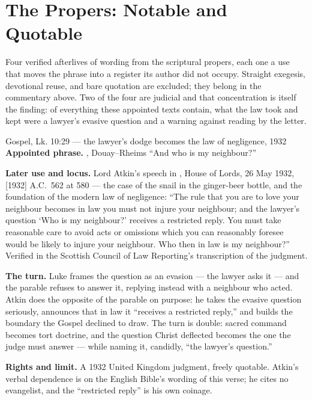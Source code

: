 \sectionguard
\section*{The Propers: Notable and Quotable}

Four verified afterlives of wording from the scriptural propers, each one a
use that moves the phrase into a register its author did not occupy. Straight
exegesis, devotional reuse, and bare quotation are excluded; they belong in
the commentary above. Two of the four are judicial and that concentration is
itself the finding: of everything these appointed texts contain, what the
law took and kept were a lawyer's evasive question and a warning against
reading by the letter.

\begin{afterlife}{Gospel, Lk. 10:29 --- the lawyer's dodge becomes the law of negligence, 1932}
\textbf{Appointed phrase.} , Douay--Rheims
``And who is my neighbour?''

\textbf{Later use and locus.} Lord Atkin's speech in , House of Lords, 26 May 1932, [1932] A.C.\ 562 at 580 --- the case
of the snail in the ginger-beer bottle, and the foundation of the modern law
of negligence: ``The rule that you are to love your neighbour becomes in law
you must not injure your neighbour; and the lawyer's question `Who is my
neighbour?' receives a restricted reply. You must take reasonable care to
avoid acts or omissions which you can reasonably foresee would be likely to
injure your neighbour. Who then in law is my neighbour?'' Verified in the
Scottish Council of Law Reporting's transcription of the judgment.

\textbf{The turn.} Luke frames the question as an evasion --- the lawyer asks
it  --- and the parable refuses to answer
it, replying instead with a neighbour who acted. Atkin does the opposite of
the parable on purpose: he takes the evasive question seriously, announces
that in law it ``receives a restricted reply,'' and builds the boundary the
Gospel declined to draw. The turn is double: sacred command becomes tort
doctrine, and the question Christ deflected becomes the one the judge must
answer --- while naming it, candidly, ``the lawyer's question.''

\textbf{Rights and limit.} A 1932 United Kingdom judgment, freely quotable.
Atkin's verbal dependence is on the English Bible's wording of this verse; he
cites no evangelist, and the ``restricted reply'' is his own coinage.
\end{afterlife}

